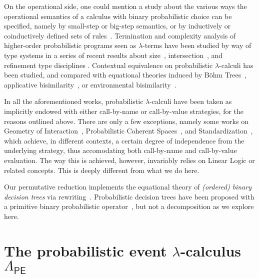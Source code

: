 \documentclass[runningheads]{llncs}
\theoremstyle{definition}
\theoremstyle{plain}
\newcommand\PEL{\Lambda_{\textsf{PE}}}
\newcommand\+[1][{}]{\kern1pt{\smallbin\oplus}_{#1}\kern1pt}
\begin{document}
On the operational side, one could mention a study about the various ways the operational semantics of a calculus with binary probabilistic choice can be specified, namely by small-step or big-step semantics, or by inductively or coinductively defined sets of rules~\cite{DalLagoZorzi12}. Termination and complexity analysis of higher-order probabilistic programs seen as $\lambda$-terms have been studied by way of type systems in a series of recent results about size~\cite{DalLagoGrellois19}, intersection~\cite{BreuvartDalLago18}, and refinement type disciplines \cite{AvanziniDalLagoGhyselen19}. Contextual equivalence on probabilistic $\lambda$-calculi has been studied, and compared with equational theories induced by B\"ohm Trees~\cite{Leventis18}, applicative bisimilarity~\cite{DalLagoSangiorgiAlberti14}, or environmental bisimilarity~\cite{SangiorgiVignudelli16}.

In all the aforementioned works, probabilistic $\lambda$-calculi have been taken as implicitly endowed with either call-by-name or call-by-value strategies, for the reasons outlined above. There are only a few exceptions, namely some works on Geometry of Interaction~\cite{DLFVY17}, Probabilistic Coherent Spaces~\cite{EhrhardTasson19}, and Standardization~\cite{FaggianRonchi19}, which achieve, in different contexts, a certain degree of independence from the underlying strategy, thus accomodating both call-by-name and call-by-value evaluation. The way this is achieved, however, invariably relies on Linear Logic or related concepts. This is deeply different from what we do here.


Our permutative reduction implements the equational theory of \emph{(ordered) binary decision trees} via rewriting~\cite{Zantema-Pol-2001}. Probabilistic decision trees have been proposed with a primitive binary probabilistic operator~\cite{Manber-Tompa-1982}, but not a decomposition as we explore here.



\section{\texorpdfstring{The probabilistic event $\lambda$-calculus $\PEL$}{The probabilistic event lambda-claculus PEL}}
\label{sec:PEL}
\end{document}

